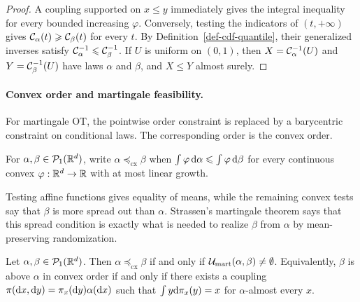 \begin{proof}
	A coupling supported on $x\leq y$ immediately gives the integral inequality for every bounded increasing $\varphi$. Conversely, testing the indicators of $(t,+\infty)$ gives $\mathcal{C}_{\alpha}(t)\geqslant\mathcal{C}_{\beta}(t)$ for every $t$. By Definition~\ref{def-cdf-quantile}, their generalized inverses satisfy $\mathcal{C}_{\alpha}^{-1}\leqslant\mathcal{C}_{\beta}^{-1}$. If $U$ is uniform on $(0,1)$, then $X=\mathcal{C}_{\alpha}^{-1}(U)$ and $Y=\mathcal{C}_{\beta}^{-1}(U)$ have laws $\alpha$ and $\beta$, and $X\leq Y$ almost surely.
\end{proof}

\paragraph{Convex order and martingale feasibility.}
For martingale OT, the pointwise order constraint is replaced by a barycentric constraint on conditional laws. The corresponding order is the convex order.
\begin{defn}\label{def-convex-order}
For $\alpha,\beta\in\mathcal{P}_1(\mathbb{R}^d)$, write $\alpha\preceq_{\mathrm{cx}}\beta$ when
$\int \varphi\,\mathrm{d}\alpha\leqslant\int \varphi\,\mathrm{d}\beta$
for every continuous convex $\varphi:\mathbb{R}^d\to\mathbb{R}$ with at most linear growth.
\end{defn}
Testing affine functions gives equality of means, while the remaining convex tests say that $\beta$ is more spread out than $\alpha$. Strassen's martingale theorem says that this spread condition is exactly what is needed to realize $\beta$ from $\alpha$ by mean-preserving randomization.

\begin{thm}\label{thm-strassen-martingale}
	Let $\alpha,\beta\in\mathcal{P}_1(\mathbb{R}^d)$. Then
	$\alpha\preceq_{\mathrm{cx}}\beta$ if and only if $\mathcal{U}_{\mathrm{mart}}(\alpha,\beta)\neq\emptyset$.
	Equivalently, $\beta$ is above $\alpha$ in convex order if and only if there exists a coupling $\pi(\mathrm{d} x,\mathrm{d} y)=\pi_x(\mathrm{d} y)\alpha(\mathrm{d} x)$ such that $\int y\mathrm{d}\pi_x(y)=x$ for $\alpha$-almost every $x$.
\end{thm}

